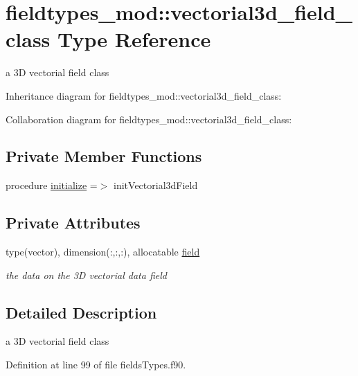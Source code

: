 \hypertarget{structfieldtypes__mod_1_1vectorial3d__field__class}{}\section{fieldtypes\+\_\+mod\+:\+:vectorial3d\+\_\+field\+\_\+class Type Reference}
\label{structfieldtypes__mod_1_1vectorial3d__field__class}


a 3D vectorial field class  




Inheritance diagram for fieldtypes\+\_\+mod\+:\+:vectorial3d\+\_\+field\+\_\+class\+:


Collaboration diagram for fieldtypes\+\_\+mod\+:\+:vectorial3d\+\_\+field\+\_\+class\+:
\subsection*{Private Member Functions}
\begin{DoxyCompactItemize}
\item 
procedure \mbox{\hyperlink{structfieldtypes__mod_1_1vectorial3d__field__class_afcbe58623943107dfed2db8166cb4abe}{initialize}} =$>$ init\+Vectorial3d\+Field
\end{DoxyCompactItemize}
\subsection*{Private Attributes}
\begin{DoxyCompactItemize}
\item 
type(vector), dimension(\+:,\+:,\+:), allocatable \mbox{\hyperlink{structfieldtypes__mod_1_1vectorial3d__field__class_a28f999baeb22a378a3714363ae1143b0}{field}}
\begin{DoxyCompactList}\small\item\em the data on the 3D vectorial data field \end{DoxyCompactList}\end{DoxyCompactItemize}


\subsection{Detailed Description}
a 3D vectorial field class 

Definition at line 99 of file fields\+Types.\+f90.




